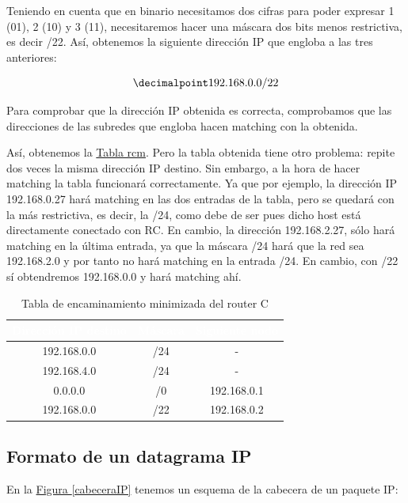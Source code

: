 \documentclass[10pt,a4paper,spanish]{report}
\begin{document}
Teniendo en cuenta que en binario necesitamos dos cifras para poder expresar 1 (01), 2 (10) y 3 (11), necesitaremos hacer una máscara dos bits menos restrictiva, es decir /22. Así, obtenemos la siguiente dirección IP que engloba a las tres anteriores:

\begin{displaymath}
  \decimalpoint
  192.168.0.0/22
\end{displaymath}

Para comprobar que la dirección IP obtenida es correcta, comprobamos que las direcciones de las subredes que engloba hacen matching con la obtenida. 

Así, obtenemos la \hyperref[rcm]{Tabla rcm}. Pero la tabla obtenida tiene otro problema: repite dos veces la misma dirección IP destino. Sin embargo, a la hora de hacer matching la tabla funcionará correctamente. Ya que por ejemplo, la dirección IP 192.168.0.27 hará matching en las dos entradas de la tabla, pero se quedará con la más restrictiva, es decir, la /24, como debe de ser pues dicho host está directamente conectado con RC. En cambio, la dirección 192.168.2.27, sólo hará matching en la última entrada, ya que la máscara /24 hará que la red sea 192.168.2.0 y por tanto no hará matching en la entrada /24. En cambio, con /22 sí obtendremos 192.168.0.0 y hará matching ahí.

\begin{table}[H]
  \centering
  \begin{tabular}{|c|c|c|}
    \hline
    \rowcolor[rgb]{0.0,0.58,0.71} \textcolor{white}{Dirección IP destino} & \textcolor{white}{Máscara} & \textcolor{white}{Siguiente nodo} \\
    \hline
     192.168.0.0 & /24 & - \\
    \hline
     192.168.4.0 & /24 & - \\
    \hline
     0.0.0.0 & /0 & 192.168.0.1 \\
    \hline
     192.168.0.0 & /22 & 192.168.0.2 \\
    \hline
  \end{tabular}
  \caption{Tabla de encaminamiento minimizada del router C}
  \label{rcm}
\end{table}

\subsection{\textcolor{tema4}Formato de un datagrama IP}
En la \hyperref[cabeceraIP]{Figura \ref*{cabeceraIP}} tenemos un esquema de la cabecera de un paquete IP:
\end{document}
